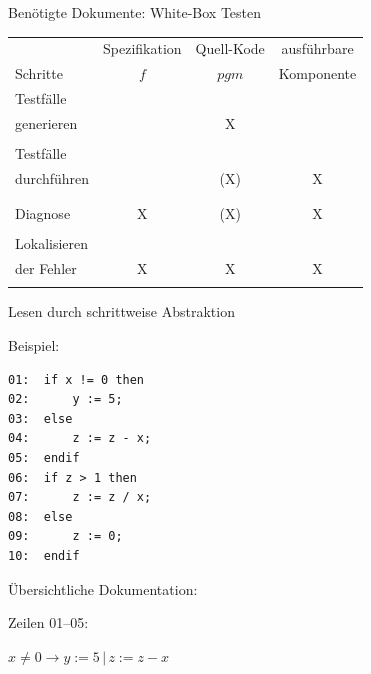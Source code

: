 \newpage
\centerline{Ben\"otigte Dokumente: White-Box Testen}
\bigskip

\begin{center}
\begin{tabular}{|l||c|c|c|}
\hline
               & Spezifikation & Quell-Kode  & ausf\"uhrbare\\
Schritte       &     $f$       & $pgm$       & Komponente\\
\hline
\hline
Testf\"alle      &               &             &       \\
generieren       &               &     X       &       \\
                 &               &             &       \\
\hline
Testf\"alle      &               &             &       \\
durchf\"uhren    &               &     (X)     &     X \\
                 &               &             &       \\
\hline
                 &               &             &       \\
Diagnose         &      X        &     (X)     &     X \\
                 &               &             &       \\
\hline
Lokalisieren     &               &             &       \\
der Fehler       &      X        &      X      &    X  \\
                 &               &             &       \\
\hline
\end{tabular}
\end{center}


\newpage
\centerline{Lesen durch schrittweise Abstraktion}

\bigskip


Beispiel:

\begin{verbatim}
01:  if x != 0 then
02:      y := 5;
03:  else
04:      z := z - x;
05:  endif
06:  if z > 1 then
07:      z := z / x;
08:  else
09:      z := 0;
10:  endif
\end{verbatim}

\"Ubersichtliche Dokumentation:

\bigskip

Zeilen 01--05:  

\(x \ne 0 \rightarrow y := 5 \,|\, z := z - x\)

\bigskip

